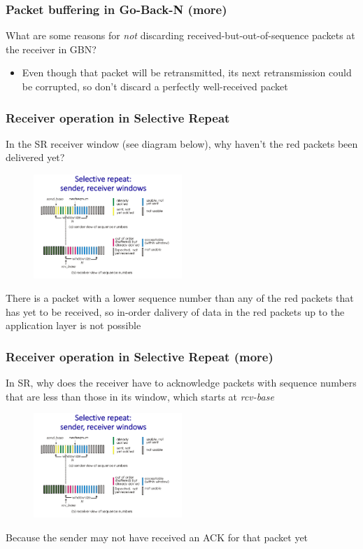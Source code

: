     \subsubsection*{Packet buffering in Go-Back-N (more)}
    \noindent What are some reasons for \textit{not} discarding received-but-out-of-sequence packets at the receiver in GBN?
    \begin{itemize}
        \item Even though that packet will be retransmitted, its next retransmission could be corrupted, so don't discard
        a perfectly well-received packet
    \end{itemize}

    \subsubsection*{Receiver operation in Selective Repeat}
    \noindent In the SR receiver window (see diagram below), why haven't the red packets been delivered yet?
    \begin{figure}[H]
        \centering
        \includegraphics[width=0.5\textwidth]{img/3.4.13.jpg}
    \end{figure}
    There is a packet with a lower sequence number than any of the red packets that has yet to be received, so in-order dalivery
    of data in the red packets up to the application layer is not possible

    \subsubsection*{Receiver operation in Selective Repeat (more)}
    \noindent In SR, why does the receiver have to acknowledge packets with sequence numbers that are less than those in its 
    window, which starts at \textit{rcv-base}
    \begin{figure}[H]
        \centering
        \includegraphics[width=0.5\textwidth]{img/3.4.13.jpg}
    \end{figure}
    Because the sender may not have received an ACK for that packet yet

